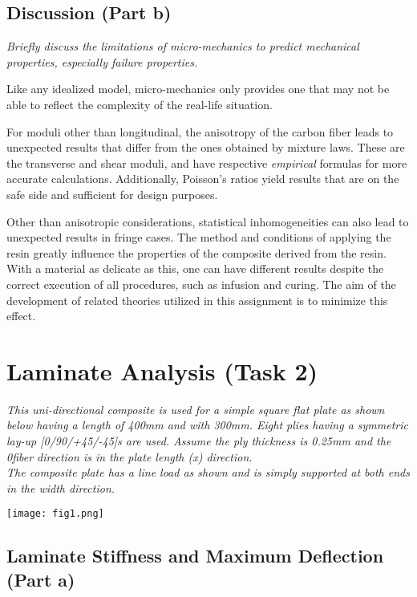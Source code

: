 \documentclass[a4paper,twosided,11pt,DIV14]{scrartcl}
\begin{document}
\subsection{Discussion (Part b)}

\textit{Briefly discuss the limitations of micro-mechanics to predict mechanical
properties, especially failure properties.}

Like any idealized model, micro-mechanics only provides one that may not be able to reflect
the complexity of the real-life situation.

For moduli other than longitudinal, the anisotropy of the carbon fiber leads to
unexpected results that differ from the ones obtained by mixture laws. These are
the transverse and shear moduli, and have respective \emph{empirical} formulas for more
accurate calculations. Additionally, Poisson's ratios yield results that are
on the safe side and sufficient for design purposes.

Other than anisotropic considerations, statistical inhomogeneities can also lead
to unexpected results in fringe cases. The method and conditions of applying the
resin greatly influence the properties of the composite derived from the resin.
With a material as delicate as this, one can have different results
despite the correct execution
of all procedures, such as infusion and curing. The aim of the development of
related theories utilized in this assignment is to minimize this effect.

\section{Laminate Analysis (Task 2)}
\textit{This uni-directional composite is used for a simple square flat plate as shown
below having a length of 400mm and with 300mm. Eight plies having a symmetric
lay-up [0/90/+45/-45]s are used. Assume the ply thickness is 0.25mm and the
0\degree fiber direction is in the plate length (x) direction.
\\The composite plate has a line load as shown and is simply supported at both
ends in the width direction.}

\begin{center}
  \texttt{[image: fig1.png]}
\end{center}

\subsection{Laminate Stiffness and Maximum Deflection (Part a)}
\end{document}
